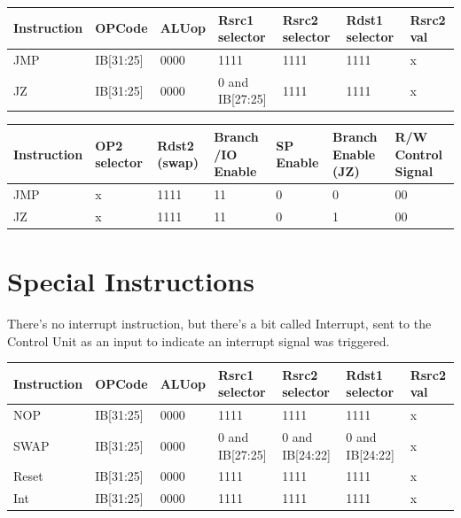 \documentclass[12pt]{report}
\begin{document}
\begin{center}
\begin{tabular}{||p{20mm}| p{15mm}| p{15mm}| p{15mm}| p{15mm}| p{15mm}| p{15mm}||} 
\hline
Instruction & OPCode & ALUop & Rsrc1 selector & Rsrc2 selector & Rdst1 selector & Rsrc2 val \\ [0.5ex] 
\hline\hline
JMP & IB[31:25] & 0000 & 1111 & 1111 & 1111 & x \\
\hline
JZ & IB[31:25] & 0000 & 0 and IB[27:25] & 1111 & 1111 & x \\
\hline
\end{tabular}
\end{center}

\begin{center}
\begin{tabular}{||p{20mm}| p{15mm}| p{15mm}| p{15mm}| p{15mm}| p{15mm}| p{15mm}||} 
\hline
Instruction & OP2 selector & Rdst2 (swap) & Branch /IO Enable & SP Enable & Branch Enable (JZ) & R/W Control Signal  \\ [0.5ex] 
\hline\hline
JMP & x & 1111 & 11 & 0 & 0 & 00 \\
\hline
JZ & x & 1111 & 11 & 0 & 1 & 00 \\
\hline
\end{tabular}
\end{center}

\section{Special Instructions}
There's no interrupt instruction, but there's a bit called Interrupt, sent to the Control Unit as an input to indicate an interrupt signal was triggered.

\begin{center}
\begin{tabular}{||p{20mm}| p{15mm}| p{15mm}| p{15mm}| p{15mm}| p{15mm}| p{15mm}||} 
\hline
Instruction & OPCode & ALUop & Rsrc1 selector & Rsrc2 selector & Rdst1 selector & Rsrc2 val \\ [0.5ex] 
\hline\hline
NOP & IB[31:25] & 0000 & 1111 & 1111 & 1111 & x \\
\hline
SWAP & IB[31:25] & 0000 & 0 and IB[27:25] & 0 and IB[24:22] & 0 and IB[24:22] & x \\
\hline
Reset & IB[31:25] & 0000 & 1111 & 1111 & 1111 & x\\
\hline
Int & IB[31:25] & 0000 & 1111 & 1111 & 1111 & x \\
\hline
\end{tabular}
\end{center}
\end{document}
